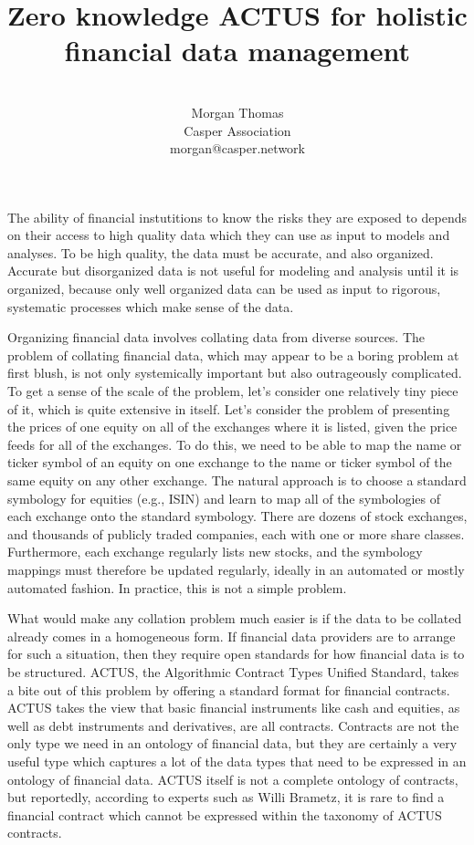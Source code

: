 \documentclass[11pt]{article}
\title{Zero knowledge ACTUS for holistic financial data management}
\author{ \\ Morgan Thomas \\ Casper Association \\ morgan@casper.network }
\begin{document}
\maketitle

The ability of financial instutitions to know the risks they are exposed to
depends on their access to high quality data which they can use as input to
models and analyses. To be high quality, the data must be accurate, and also
organized. Accurate but disorganized data is not useful for modeling and analysis
until it is organized, because only well organized data can be used as input to
rigorous, systematic processes which make sense of the data.

Organizing financial data involves collating data from diverse sources.
The problem of collating financial data, which may appear to be a boring problem
at first blush, is not only systemically important but also outrageously
complicated. To get a sense of the scale of the problem, let's consider one
relatively tiny piece of it, which is quite extensive in itself. Let's consider
the problem of presenting the prices of one equity on all of the exchanges
where it is listed, given the price feeds for all of the exchanges. To do this,
we need to be able to map the name or ticker symbol of an equity on one exchange
to the name or ticker symbol of the same equity on any other exchange. The natural
approach is to choose a standard symbology for equities (e.g., ISIN)
and learn to map all of the symbologies of each exchange onto the standard
symbology. There are dozens
of stock exchanges, and thousands of publicly traded companies, each with one
or more share classes. Furthermore, each exchange regularly lists new stocks, and
the symbology mappings must therefore be updated regularly, ideally in an automated
or mostly automated fashion. In practice, this is not a simple problem.

What would make any collation problem much easier is if the data to be collated
already comes in a homogeneous form. If financial data providers are to arrange
for such a situation, then they require open standards for how financial data is to
be structured.
ACTUS, the Algorithmic Contract Types Unified Standard, takes a bite out of this
problem by offering a standard format for financial contracts. ACTUS takes the
view that basic financial instruments like cash and equities, as well as
debt instruments and derivatives, are all contracts. Contracts are not the only
type we need in an ontology of financial data, but they are certainly a very
useful type which captures a lot of the data types that need to be expressed
in an ontology of financial data. ACTUS itself is not a complete ontology of
contracts, but reportedly, according to experts such as Willi Brametz, it is rare to find a financial
contract which cannot be expressed within the taxonomy of ACTUS contracts.
\end{document}
